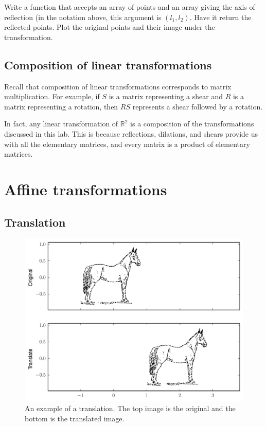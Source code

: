 \begin{problem}
Write a function that accepts an array of points and an array giving the axis of reflection (in the notation above, this argument is $(l_1, l_2)$. Have it return the reflected points.
Plot the original points and their image under the transformation.
\end{problem}

\subsection*{Composition of linear transformations}
Recall that composition of linear transformations corresponds to matrix multiplication. For example, if $S$ is a matrix representing a shear and $R$ is a matrix representing a rotation, then $RS$ represents a shear followed by a rotation.

In fact, any linear transformation of $\mathbb{R}^2$ is a composition of the transformations discussed in this lab. This is because reflections, dilations, and shears provide us with all the elementary matrices, and every matrix is a product of elementary matrices. 

\section*{Affine transformations}
\subsection*{Translation}

\begin{figure}
\includegraphics[width=\textwidth]{translate.pdf}
\caption{
An example of a translation.
The top image is the original and the bottom is the translated image.}
\label{basis:translate}
\end{figure}

